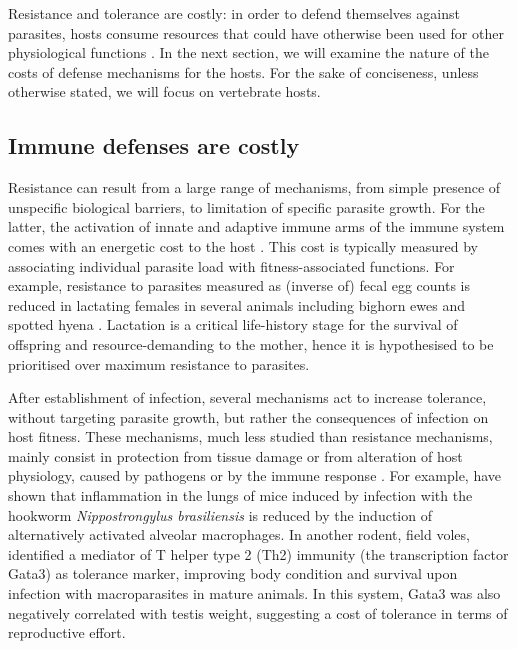 \par
Resistance and tolerance are costly: in order to defend themselves against parasites, hosts consume resources that could have otherwise been used for other physiological functions \citep{sheldon_ecological_1996}. In the next section, we will examine the nature of the costs of defense mechanisms for the hosts. For the sake of conciseness, unless otherwise stated, we will focus on vertebrate hosts.

\subsection{Immune defenses are costly}
Resistance can result from a large range of mechanisms, from simple presence of unspecific biological barriers, to limitation of specific parasite growth. For the latter, the activation of innate and adaptive immune arms of the immune system comes with an energetic cost to the host \citep{schmid-hempel_evolutionary_2013}. This cost is typically measured by associating individual parasite load with fitness-associated functions. For example, resistance to parasites measured as (inverse of) fecal egg counts is reduced in lactating females in several animals including bighorn ewes \citep{festa-bianchet_individual_1989} and spotted hyena \citep{east_does_2015}. Lactation is a critical life-history stage for the survival of offspring and resource-demanding to the mother, hence it is hypothesised to be prioritised over maximum resistance to parasites.
\par
After establishment of infection, several mechanisms act to increase tolerance, without targeting parasite growth, but rather the consequences of infection on host fitness. These mechanisms, much less studied than resistance mechanisms, mainly consist in protection from tissue damage or from alteration of host physiology, caused by pathogens or by the immune response \citep{medzhitov_disease_2012}. For example, \cite{reece_innate_2006} have shown that inflammation in the lungs of mice induced by infection with the hookworm \textit{Nippostrongylus brasiliensis} is reduced by the induction of alternatively activated alveolar macrophages. In another rodent, field voles, \cite{jackson_immunological_2014} identified a mediator of  T helper type 2 (Th2) immunity (the transcription factor Gata3) as tolerance marker, improving body condition and survival upon infection with macroparasites in mature animals. In this system, Gata3 was also negatively correlated with testis weight, suggesting a cost of tolerance in terms of reproductive effort.
